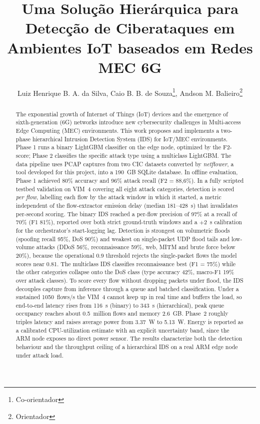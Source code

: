 \documentclass[12pt]{article}
\title{Uma Solução Hierárquica para Detecção de Ciberataques em Ambientes IoT baseados em Redes MEC 6G }
\author{Luiz Henrique B. A. da Silva, Caio B. B. de Souza\thanks{Co-orientador}, Andson M. Balieiro\thanks{Orientador} }
\begin{document}
\maketitle

\begin{abstract}
The exponential growth of Internet of Things (IoT) devices and the emergence
of sixth-generation (6G) networks introduce new cybersecurity challenges in
Multi-access Edge Computing (MEC) environments. This work proposes and
implements a two-phase hierarchical Intrusion Detection System (IDS) for
IoT/MEC environments. Phase 1 runs a binary LightGBM classifier on the edge
node, optimized by the F2-score; Phase 2 classifies the specific attack type
using a multiclass LightGBM. The data
pipeline uses PCAP captures from two CIC datasets converted by
\textit{netflower}, a tool developed for this project, into a 190~GB SQLite
database. In offline evaluation, Phase 1 achieved 80\% accuracy and 96\%
attack recall (F2 = 88,6\%). In a fully scripted testbed validation on VIM~4
covering all eight attack categories, detection is scored \emph{per flow},
labelling each flow by the attack window in which it started, a metric
independent of the flow-extractor emission delay (median 181--428~s) that
invalidates per-second scoring. The binary IDS reached a per-flow precision of
97\% at a recall of 70\% (F1 81\%), reported over both strict ground-truth
windows and a $+2$~s calibration for the orchestrator's start-logging lag.
Detection is strongest on volumetric floods (spoofing recall 95\%, DoS 90\%)
and weakest on single-packet UDP flood tails and low-volume attacks (DDoS 56\%,
reconnaissance 59\%, web, MITM and brute force below 20\%), because the
operational 0.9 threshold rejects the single-packet flows the model scores near
0.81. The multiclass IDS classifies reconnaissance best (F1 = 75\%) while the
other categories collapse onto the DoS class (type accuracy 42\%, macro-F1 19\%
over attack classes). To score every flow without dropping packets under flood,
the IDS decouples capture from inference through a queue and batched
classification. Under a sustained 1050~flows/s the VIM~4 cannot keep up in real
time and buffers the load, so end-to-end latency rises from 116~s (binary) to
343~s (hierarchical), peak queue occupancy reaches about 0.5~million flows and
memory 2.6~GB. Phase~2 roughly triples latency and raises average power from
3.37~W to 5.13~W. Energy is reported as a calibrated CPU-utilization estimate
with an explicit uncertainty band, since the ARM node exposes no direct power
sensor. The results characterize both the detection behaviour and the
throughput ceiling of a hierarchical IDS on a real ARM edge node under attack
load.
\end{abstract}
\end{document}
